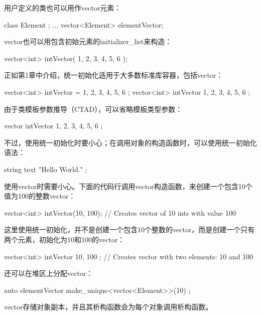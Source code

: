 用户定义的类也可以用作vector元素：

\begin{cpp}
class Element { };
...
vector<Element> elementVector;
\end{cpp}

vector也可以用包含初始元素的initializer\_list来构造：

\begin{cpp}
vector<int> intVector({ 1, 2, 3, 4, 5, 6 });
\end{cpp}

正如第1章中介绍，统一初始化适用于大多数标准库容器，包括vector：

\begin{cpp}
vector<int> intVector = { 1, 2, 3, 4, 5, 6 };
vector<int> intVector { 1, 2, 3, 4, 5, 6 };
\end{cpp}

由于类模板参数推导（CTAD），可以省略模板类型参数：

\begin{cpp}
vector intVector { 1, 2, 3, 4, 5, 6 };
\end{cpp}

不过，使用统一初始化时要小心；在调用对象的构造函数时，可以使用统一初始化语法：

\begin{cpp}
string text { "Hello World." };
\end{cpp}

使用vector时需要小心。下面的代码行调用vector构造函数，来创建一个包含10个值为100的整数vector：

\begin{cpp}
vector<int> intVector(10, 100); // Creates vector of 10 ints with value 100
\end{cpp}

这里使用统一初始化，并不是创建一个包含10个整数的vector，而是创建一个只有两个元素，初始化为10和100的vector：

\begin{cpp}
vector<int> intVector { 10, 100 }; // Creates vector with two elements: 10 and 100
\end{cpp}

还可以在堆区上分配vector：

\begin{cpp}
auto elementVector { make_unique<vector<Element>>(10) };
\end{cpp}


vector存储对象副本，并且其析构函数会为每个对象调用析构函数。

